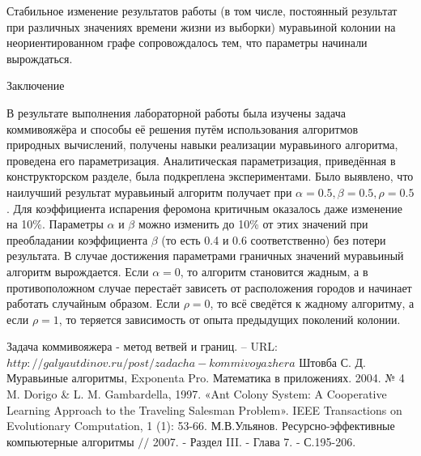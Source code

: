 \documentclass[12pt,a4paper]{scrartcl}
\begin{document}
Стабильное изменение результатов работы (в том числе, постоянный результат при различных значениях времени жизни из выборки) муравьиной колонии на неориентированном графе сопровождалось тем, что параметры начинали вырождаться.

 \clearpage
{}

\begin{center}
Заключение
\end{center}

В результате выполнения лабораторной работы была изучены задача коммивояжёра и способы её решения путём использования алгоритмов природных вычислений, получены навыки реализации муравьиного алгоритма, проведена его параметризация. Аналитическая параметризация, приведённая в конструкторском разделе, была подкреплена экспериментами. Было выявлено, что наилучший результат муравьиный алгоритм получает при $\alpha = 0.5, \beta = 0.5, ρ = 0.5$. Для коэффициента испарения феромона критичным оказалось даже изменение на 10\%. Параметры $\alpha$ и $\beta$ можно изменить до 10\% от этих значений при преобладании коэффициента $\beta$ (то есть 0.4 и 0.6 соответственно) без потери результата. В случае достижения параметрами граничных значений муравьиный алгоритм вырождается. Если $\alpha = 0$, то алгоритм становится жадным, а в противоположном случае перестаёт зависеть от расположения городов и начинает работать случайным образом. Если $ρ = 0$, то всё сведётся к жадному алгоритму, а если $ρ = 1$, то теряется зависимость от опыта предыдущих поколений колонии.

 \clearpage
{}
\begin{thebibliography}{00} %

Задача коммивояжера - метод ветвей и границ. -- URL: $http://galyautdinov.ru/post/zadacha-kommivoyazhera$
Штовба С. Д. Муравьиные алгоритмы, Exponenta Pro. Математика в приложениях. 2004. № 4
M. Dorigo \& L. M. Gambardella, 1997. «Ant Colony System: A Cooperative Learning Approach to the Traveling Salesman Problem». IEEE Transactions on Evolutionary Computation, 1 (1): 53-66.
М.В.Ульянов. Ресурсно-эффективные компьютерные алгоритмы $//$ 2007. - Раздел III. - Глава 7. - С.195-206.
\end{thebibliography}
\end{document}
